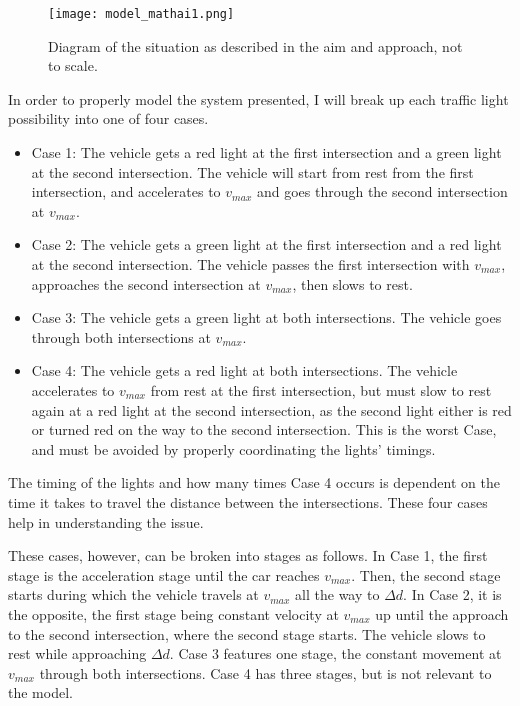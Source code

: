 \documentclass[11pt]{article}
\begin{document}

\begin{figure}[h!]
    \centering
    \texttt{[image: model\_mathai1.png]}
    \caption{Diagram of the situation as described in the aim and approach, not to scale.}
\end{figure} 

\FloatBarrier

In order to properly model the system presented, I will break up each traffic light possibility into one of four cases. 

\begin{itemize}
    \item Case 1: The vehicle gets a red light at the first intersection and a green light at the second intersection. The vehicle will start from rest from the first intersection, and accelerates to ${v}_{max}$ and goes through the second intersection at ${v}_{max}$.
    \item Case 2: The vehicle gets a green light at the first intersection and a red light at the second intersection. The vehicle passes the first intersection with ${v}_{max}$, approaches the second intersection at ${v}_{max}$, then slows to rest.
    \item Case 3: The vehicle gets a green light at both intersections. The vehicle goes through both intersections at ${v}_{max}$.
    \item Case 4: The vehicle gets a red light at both intersections. The vehicle accelerates to ${v}_{max}$ from rest at the first intersection, but must slow to rest again at a red light at the second intersection, as the second light either is red or turned red on the way to the second intersection. This is the worst Case, and must be avoided by properly coordinating the lights' timings.
\end{itemize}

The timing of the lights and how many times Case 4 occurs is dependent on the time it takes to travel the distance between the intersections. These four cases help in understanding the issue. 

These cases, however, can be broken into stages as follows. In Case 1, the first stage is the acceleration stage until the car reaches ${v}_{max}$. Then, the second stage starts during which the vehicle travels at ${v}_{max}$ all the way to $\Delta d$. In Case 2, it is the opposite, the first stage being constant velocity at ${v}_{max}$ up until the approach to the second intersection, where the second stage starts. The vehicle slows to rest while approaching $\Delta d$. Case 3 features one stage, the constant movement at ${v}_{max}$ through both intersections. Case 4 has three stages, but is not relevant to the model.
\end{document}
